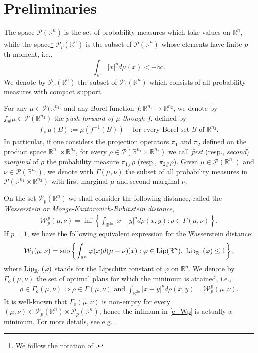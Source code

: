 \documentclass[A4paper,11pt]{article}
\theoremstyle{definition}
\newcommand{\Lip}{\textup{Lip}}
\newcommand{\N}{\mathbb{N}}
\newcommand{\R}{\mathbb{R}}
\newcommand{\W}{\mathcal{W}}
\DeclareMathOperator{\supp}{supp}
\begin{document}
\section{Preliminaries}\label{meanfield}


The space $\mathcal{P}(\R^n)$ is the set of probability measures which take values on $\R^n$, while the space\footnote{We follow the notation of \cite{AGS}.} $\mathcal{P}_p(\R^n)$ is the subset of $\mathcal{P}(\R^n)$ whose elements have finite $p$-th moment, i.e.,
$$\int_{\R^n} |x|^p d\mu(x) < +\infty.$$
We denote by $\mathcal{P}_c(\R^n)$ the subset of $\mathcal{P}_1(\R^n)$ which consists of all probability measures with compact support. %

For any $\mu \in \mathcal{P}(\R^{n_1)}$ and any Borel function $f: \R^{n_1} \to \R^{n_2}$, we denote by $f_{\#}\mu \in \mathcal{P}(\R^{n_2})$ the {\it push-forward of $\mu$ through $f$}, defined by
\begin{align*}
f_{\#}\mu(B) := \mu(f^{-1}(B)) \quad \text{ for every Borel set } B \text{ of } \R^{n_2}.
\end{align*}
In particular, if one considers the projection operators $\pi_1$ and $\pi_2$ defined on the product space $\R^{n_1} \times \R^{n_2}$, for every $\rho \in \mathcal{P}(\R^{n_1} \times \R^{n_2})$ we call {\it first} (resp., {\it second}) {\it marginal} of $\rho$ the probability measure $\pi_{1\#}\rho$ (resp., $\pi_{2\#}\rho$). Given $\mu \in \mathcal{P}(\R^{n_1})$ and $\nu \in \mathcal{P}(\R^{n_2})$, we denote with $\Gamma(\mu, \nu)$ the subset of all probability measures in $\mathcal{P}(\R^{n_1} \times \R^{n_2})$ with first marginal $\mu$ and second marginal $\nu$.

On the set $\mathcal{P}_p(\R^n)$ we shall consider the following distance, called the {\it Wasserstein or Monge-Kantorovich-Rubinstein distance},
\begin{align}  \label{e_Wp}
\W^p_p(\mu,\nu)=\inf \left \{ \int_{\R^{2n}} |x-y|^p d \rho(x,y) : \rho \in \Gamma(\mu,\nu) \right \}.
\end{align}
If $p = 1$, we have the following equivalent expression for the Wasserstein distance:
\begin{align*}
\W_1(\mu,\nu)=\sup \left \{ \int_{\R^n} \varphi(x) d (\mu-\nu)(x)  : \varphi \in \Lip(\R^n), \; \Lip_{\R^n}(\varphi) \leq 1 \right \},
\end{align*}
where $\Lip_{\R^n}(\varphi)$ stands for the Lipschitz constant of $\varphi$ on $\R^n$. We denote by $\Gamma_o(\mu,\nu)$ the set of optimal plans for which the minimum is attained, i.e.,
\begin{align*}
\rho \in \Gamma_o(\mu, \nu) \iff \rho \in \Gamma(\mu, \nu) \text{ and } \int_{\R^{2n}} | x - y |^p d \rho(x,y) = \W^p_p(\mu,\nu).
\end{align*}
It is well-known that $\Gamma_o(\mu, \nu)$ is non-empty for every $(\mu,\nu) \in \mathcal{P}_p(\R^n)\times\mathcal{P}_p(\R^n)$, hence the infimum in \eqref{e_Wp} is actually a minimum. For more details, see e.g. \cite{AGS,villani}.
\end{document}
